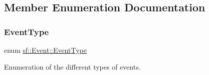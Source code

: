 \subsection{Member Enumeration Documentation}
\mbox{\label{classsf_1_1_event_af41fa9ed45c02449030699f671331d4a}} 
\subsubsection{\texorpdfstring{EventType}{EventType}}
{\footnotesize\ttfamily enum \mbox{\hyperlink{classsf_1_1_event_af41fa9ed45c02449030699f671331d4a}{sf\+::\+Event\+::\+Event\+Type}}}



Enumeration of the different types of events. 

